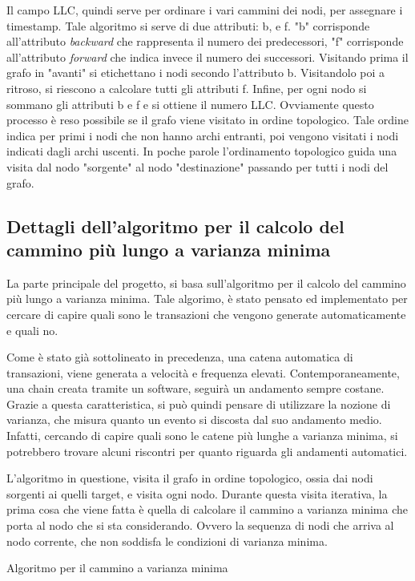 Il campo LLC, quindi serve per ordinare i vari cammini dei nodi, per assegnare i timestamp. Tale algoritmo si serve di due attributi: b, e f. "b" corrisponde all'attributo \textit{backward} che rappresenta il numero dei predecessori, "f" corrisponde all'attributo \textit{forward} che indica invece il numero dei successori. Visitando prima il grafo in "avanti" si etichettano i nodi secondo l'attributo b. Visitandolo poi a ritroso, si riescono a calcolare tutti gli attributi f. Infine, per ogni nodo si sommano gli attributi b e f e si ottiene il numero LLC. Ovviamente questo processo è reso possibile se il grafo viene visitato in ordine topologico. Tale ordine indica per primi i nodi che non hanno archi entranti, poi vengono visitati i nodi indicati dagli archi uscenti. In poche parole l'ordinamento topologico guida una visita dal nodo "sorgente" al nodo "destinazione" passando per tutti i nodi del grafo. 

\subsection{Dettagli dell'algoritmo per il calcolo del cammino più lungo a varianza minima}
La parte principale del progetto, si basa sull'algoritmo per il calcolo del cammino più lungo a varianza minima. Tale algorimo, è stato pensato ed implementato per cercare di capire quali sono le transazioni che vengono generate automaticamente e quali no. 

Come è stato già sottolineato in precedenza, una catena automatica di transazioni, viene generata a velocità e frequenza elevati. Contemporaneamente, una chain creata tramite un software, seguirà un andamento sempre costane. Grazie a questa caratteristica, si può quindi pensare di utilizzare la nozione di varianza, che misura quanto un evento si discosta dal suo andamento medio. Infatti, cercando di capire quali sono le catene più lunghe a varianza minima, si potrebbero trovare alcuni riscontri per quanto riguarda gli andamenti automatici.

L'algoritmo in questione, visita il grafo in ordine topologico, ossia dai nodi sorgenti ai quelli target, e visita ogni nodo. Durante questa visita iterativa, la prima cosa che viene fatta è quella di calcolare il cammino a varianza minima che porta al nodo che si sta considerando. Ovvero la sequenza di nodi che arriva al nodo corrente, che non soddisfa le condizioni di varianza minima. 

\begin{algorithm}[h]
	\caption{Algoritmo per il cammino a varianza minima} \label{algo:getpath}
	\begin{algorithmic}
			 \EndIf	 
		\EndFor	
	\end{algorithmic}	
\end{algorithm} 

